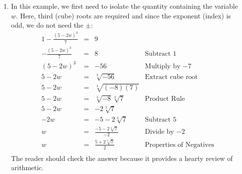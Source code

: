 \documentclass{ximera}
\begin{document}
\begin{example}
\begin{explanation}
\begin{enumerate}
\[\begin{array}{rclr}
(5x +3)^{4} & = & 16 & \\  

5x+3 & = & \pm \sqrt[4]{16} & \text{Extract fourth roots} \\  

5x + 3 & = & \pm 2 & \\  

5x+3 = 2 & \text{or} & 5x+3 = -2 & \\

x = -\frac{1}{5} & \text{or} & x = -1 \\ \end{array} \] We leave it to the reader to verify that both of these solutions satisfy the original equation.

\item  In this example, we first need to isolate the quantity containing the variable $w$.  Here, third (cube) roots are required and since the exponent (index) is odd, we do not need the $\pm$:\[ \begin{array}{rclr} 

1 - \frac{(5-2w)^3}{7} & = &  9 & \\  


- \frac{(5-2w)^3}{7} & = & 8 & \text{Subtract $1$} \\ 

(5-2w) ^ 3 & = & -56 & \text{Multiply by $-7$} \\ 

5 - 2w & = & \sqrt[3]{-56} & \text{Extract cube root} \\ 

5 - 2w & = & \sqrt[3]{(-8)(7)} & \\ 

5 - 2w & = & \sqrt[3]{-8} \sqrt[3]{7} & \text{Product Rule}\\ 

5 - 2w & = & -2\sqrt[3]{7} & \\ 

-2w & = & -5-2 \sqrt[3]{7} & \text{Subtract $5$} \\ 

w & = & \frac{-5 - 2\sqrt[3]{7}}{-2} & \text{Divide by $-2$} \\ 

w & = & \frac{5 + 2\sqrt[3]{7}}{2} & \text{Properties of Negatives} \\

\end{array}\] The reader should check the answer because it provides a hearty review of arithmetic.


\end{enumerate}
\end{explanation}
\end{example}
\end{document}
